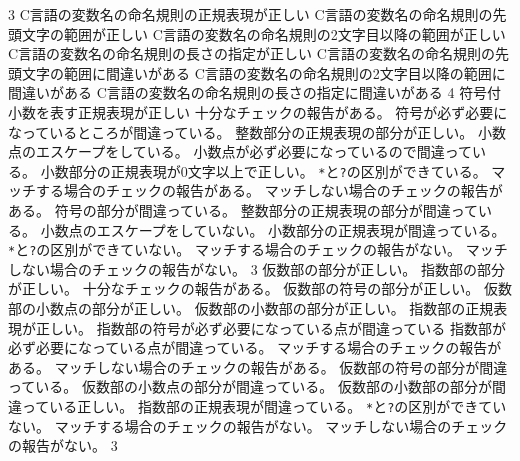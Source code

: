 \ProblemNN{


\Newpage


}
{
{}{3}
	{
	{C言語の変数名の命名規則の正規表現が正しい}
	}
	{
	{C言語の変数名の命名規則の先頭文字の範囲が正しい}
	{C言語の変数名の命名規則の2文字目以降の範囲が正しい}
	{C言語の変数名の命名規則の長さの指定が正しい}
	}
	{
	{C言語の変数名の命名規則の先頭文字の範囲に間違いがある}
	{C言語の変数名の命名規則の2文字目以降の範囲に間違いがある}
	{C言語の変数名の命名規則の長さの指定に間違いがある}
	}
	{}{4}
	{
	{符号付小数を表す正規表現が正しい}
	{十分なチェックの報告がある。}
	}
	{
	{符号が必ず必要になっているところが間違っている。}
	{整数部分の正規表現の部分が正しい。}
	{小数点のエスケープをしている。}
	{小数点が必ず必要になっているので間違っている。}
	{小数部分の正規表現が0文字以上で正しい。}
	{\texttt{*}と\texttt{?}の区別ができている。}
	{マッチする場合のチェックの報告がある。}
	{マッチしない場合のチェックの報告がある。}
	}
	{
	{符号の部分が間違っている。}
	{整数部分の正規表現の部分が間違っている。}
	{小数点のエスケープをしていない。}
	{小数部分の正規表現が間違っている。}
	{\texttt{*}と\texttt{?}の区別ができていない。}
	{マッチする場合のチェックの報告がない。}
	{マッチしない場合のチェックの報告がない。}
	}
	{}{3}
	{
	{仮数部の部分が正しい。}
	{指数部の部分が正しい。}
	{十分なチェックの報告がある。}
	}
	{
	{仮数部の符号の部分が正しい。}
	{仮数部の小数点の部分が正しい。}
	{仮数部の小数部の部分が正しい。}
	{指数部の正規表現が正しい。}
	{指数部の符号が必ず必要になっている点が間違っている}
	{指数部が必ず必要になっている点が間違っている。}
	{マッチする場合のチェックの報告がある。}
	{マッチしない場合のチェックの報告がある。}
	}
	{
	{仮数部の符号の部分が間違っている。}
	{仮数部の小数点の部分が間違っている。}
	{仮数部の小数部の部分が間違っている正しい。}
	{指数部の正規表現が間違っている。}
	{\texttt{*}と\texttt{?}の区別ができていない。}
	{マッチする場合のチェックの報告がない。}
	{マッチしない場合のチェックの報告がない。}
	}
	{}{3}
}
